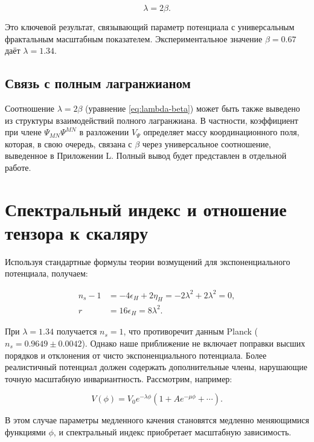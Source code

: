 \documentclass[11pt,a4paper]{article}
\newcommand{\rs}{r}
\begin{document}
	\begin{equation}
		\lambda = 2\beta.
		\label{eq:lambda-beta}
	\end{equation}
	
	Это ключевой результат, связывающий параметр потенциала с универсальным фрактальным масштабным показателем. Экспериментальное значение \(\beta = 0.67\) даёт \(\lambda = 1.34\).
	
	\subsection{Связь с полным лагранжианом}
	
	Соотношение \(\lambda = 2\beta\) (уравнение \ref{eq:lambda-beta}) может быть также выведено из структуры взаимодействий полного лагранжиана. В частности, коэффициент при члене \(\Psi_{MN}\Psi^{MN}\) в разложении \(V_{\Psi}\) определяет массу координационного поля, которая, в свою очередь, связана с \(\beta\) через универсальное соотношение, выведенное в Приложении L. Полный вывод будет представлен в отдельной работе.
	
	\section{Спектральный индекс и отношение тензора к скаляру}
	\label{sec:predictions}
	
	Используя стандартные формулы теории возмущений для экспоненциального потенциала, получаем:
	
	\begin{align}
		n_s - 1 &= -4\epsilon_H + 2\eta_H = -2\lambda^2 + 2\lambda^2 = 0, \label{eq:ns-temp}\\
		\rs &= 16\epsilon_H = 8\lambda^2. \label{eq:r-pred}
	\end{align}
	
	При \(\lambda = 1.34\) получается \(n_s = 1\), что противоречит данным Planck (\(n_s = 0.9649 \pm 0.0042\)). Однако наше приближение не включает поправки высших порядков и отклонения от чисто экспоненциального потенциала. Более реалистичный потенциал должен содержать дополнительные члены, нарушающие точную масштабную инвариантность. Рассмотрим, например:
	
	\begin{equation}
		V(\phi) = V_0 e^{-\lambda \phi} \left(1 + A e^{-\mu \phi} + \cdots \right).
	\end{equation}
	
	В этом случае параметры медленного качения становятся медленно меняющимися функциями \(\phi\), и спектральный индекс приобретает масштабную зависимость.
	
\end{document}
